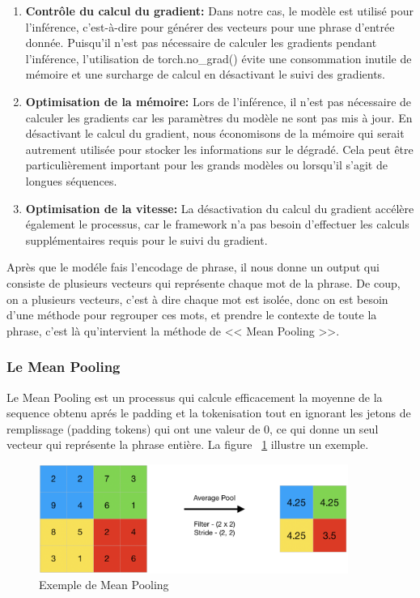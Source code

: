 \begin{enumerate}
	\item \small\textbf{Contrôle du calcul du gradient: }Dans notre cas, le modèle est utilisé pour l'inférence, c'est-à-dire pour générer des vecteurs pour une phrase d'entrée donnée. Puisqu'il n'est pas nécessaire de calculer les gradients pendant l'inférence, l'utilisation de torch.no\_grad() évite une consommation inutile de mémoire et une surcharge de calcul en désactivant le suivi des gradients.
	\item \small\textbf{Optimisation de la mémoire: }Lors de l'inférence, il n'est pas nécessaire de calculer les gradients car les paramètres du modèle ne sont pas mis à jour. En désactivant le calcul du gradient, nous économisons de la mémoire qui serait autrement utilisée pour stocker les informations sur le dégradé. Cela peut être particulièrement important pour les grands modèles ou lorsqu’il s’agit de longues séquences.

	\item \small\textbf{Optimisation de la vitesse: }La désactivation du calcul du gradient accélère également le processus, car le framework n'a pas besoin d'effectuer les calculs supplémentaires requis pour le suivi du gradient.
\end{enumerate}

\noindent
Après que le modéle fais l'encodage de phrase, il nous donne un output qui consiste de plusieurs vecteurs qui représente chaque mot de la phrase. De coup, on a plusieurs vecteurs, c'est à dire chaque mot est isolée, donc on est besoin d'une méthode pour regrouper ces mots, et prendre le contexte de toute la phrase, c'est là qu'intervient la méthode de << Mean Pooling >>.

\subsubsection{Le Mean Pooling}
\noindent
Le Mean Pooling est un processus qui calcule efficacement la moyenne de la sequence obtenu aprés le padding et la tokenisation tout en ignorant les jetons de remplissage (padding tokens) qui ont une valeur de 0, ce qui donne un seul vecteur qui représente la phrase entière. La figure ~\ref{fig:meanpoolingex} illustre un exemple.

\begin{figure}[H]
	\centering
	\includegraphics[width=0.9\textwidth]{logos/mean_pooling.png}
	\caption{Exemple de Mean Pooling}
	\label{fig:meanpoolingex}
\end{figure}

